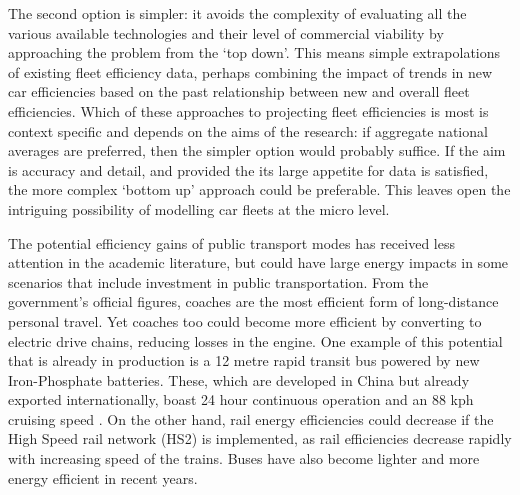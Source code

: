 The second option is simpler: it avoids the complexity of
evaluating all the various available technologies and their level of
commercial viability by approaching the problem from the `top down'. This
means simple extrapolations of existing fleet efficiency data, perhaps
combining the impact of trends in new car efficiencies based on the past
relationship between new and overall fleet efficiencies. Which of these
approaches to projecting fleet efficiencies is most is context specific and
depends on the aims of the research:
if aggregate national averages are preferred, then the simpler option would
probably suffice. If the aim is accuracy and detail, and provided the
its large appetite for data is satisfied, the more complex `bottom up'
approach could be preferable. This leaves open the intriguing possibility of
modelling car fleets at the micro level. 

The potential efficiency gains of public transport modes has received less
attention in the academic literature, but could have large energy impacts
in some scenarios that include investment in public transportation.
From the government's official figures, coaches are the most efficient
form of long-distance personal travel. Yet coaches too could become
more efficient by converting to electric drive chains, reducing losses
in the engine. One example of this potential that is already in production
is a 12 metre rapid transit bus powered by new Iron-Phosphate batteries.
These, which are developed in China but already exported internationally,
boast 24 hour continuous operation and an 88 kph cruising speed
\citep{BreakingTravelNews}. On the other hand, rail energy efficiencies could
decrease if the High Speed rail network (HS2) is implemented, as
rail efficiencies decrease rapidly with increasing speed of the trains.
Buses have also become lighter and more
energy efficient in recent years.


